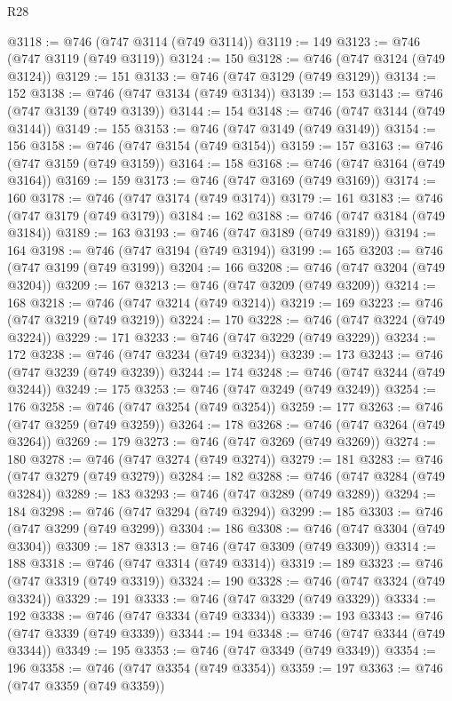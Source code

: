 \begin{lexlean}{R28}
\begin{coremodule}
@3118 := @746 (@747 @3114 (@749 @3114))
@3119 := 149
@3123 := @746 (@747 @3119 (@749 @3119))
@3124 := 150
@3128 := @746 (@747 @3124 (@749 @3124))
@3129 := 151
@3133 := @746 (@747 @3129 (@749 @3129))
@3134 := 152
@3138 := @746 (@747 @3134 (@749 @3134))
@3139 := 153
@3143 := @746 (@747 @3139 (@749 @3139))
@3144 := 154
@3148 := @746 (@747 @3144 (@749 @3144))
@3149 := 155
@3153 := @746 (@747 @3149 (@749 @3149))
@3154 := 156
@3158 := @746 (@747 @3154 (@749 @3154))
@3159 := 157
@3163 := @746 (@747 @3159 (@749 @3159))
@3164 := 158
@3168 := @746 (@747 @3164 (@749 @3164))
@3169 := 159
@3173 := @746 (@747 @3169 (@749 @3169))
@3174 := 160
@3178 := @746 (@747 @3174 (@749 @3174))
@3179 := 161
@3183 := @746 (@747 @3179 (@749 @3179))
@3184 := 162
@3188 := @746 (@747 @3184 (@749 @3184))
@3189 := 163
@3193 := @746 (@747 @3189 (@749 @3189))
@3194 := 164
@3198 := @746 (@747 @3194 (@749 @3194))
@3199 := 165
@3203 := @746 (@747 @3199 (@749 @3199))
@3204 := 166
@3208 := @746 (@747 @3204 (@749 @3204))
@3209 := 167
@3213 := @746 (@747 @3209 (@749 @3209))
@3214 := 168
@3218 := @746 (@747 @3214 (@749 @3214))
@3219 := 169
@3223 := @746 (@747 @3219 (@749 @3219))
@3224 := 170
@3228 := @746 (@747 @3224 (@749 @3224))
@3229 := 171
@3233 := @746 (@747 @3229 (@749 @3229))
@3234 := 172
@3238 := @746 (@747 @3234 (@749 @3234))
@3239 := 173
@3243 := @746 (@747 @3239 (@749 @3239))
@3244 := 174
@3248 := @746 (@747 @3244 (@749 @3244))
@3249 := 175
@3253 := @746 (@747 @3249 (@749 @3249))
@3254 := 176
@3258 := @746 (@747 @3254 (@749 @3254))
@3259 := 177
@3263 := @746 (@747 @3259 (@749 @3259))
@3264 := 178
@3268 := @746 (@747 @3264 (@749 @3264))
@3269 := 179
@3273 := @746 (@747 @3269 (@749 @3269))
@3274 := 180
@3278 := @746 (@747 @3274 (@749 @3274))
@3279 := 181
@3283 := @746 (@747 @3279 (@749 @3279))
@3284 := 182
@3288 := @746 (@747 @3284 (@749 @3284))
@3289 := 183
@3293 := @746 (@747 @3289 (@749 @3289))
@3294 := 184
@3298 := @746 (@747 @3294 (@749 @3294))
@3299 := 185
@3303 := @746 (@747 @3299 (@749 @3299))
@3304 := 186
@3308 := @746 (@747 @3304 (@749 @3304))
@3309 := 187
@3313 := @746 (@747 @3309 (@749 @3309))
@3314 := 188
@3318 := @746 (@747 @3314 (@749 @3314))
@3319 := 189
@3323 := @746 (@747 @3319 (@749 @3319))
@3324 := 190
@3328 := @746 (@747 @3324 (@749 @3324))
@3329 := 191
@3333 := @746 (@747 @3329 (@749 @3329))
@3334 := 192
@3338 := @746 (@747 @3334 (@749 @3334))
@3339 := 193
@3343 := @746 (@747 @3339 (@749 @3339))
@3344 := 194
@3348 := @746 (@747 @3344 (@749 @3344))
@3349 := 195
@3353 := @746 (@747 @3349 (@749 @3349))
@3354 := 196
@3358 := @746 (@747 @3354 (@749 @3354))
@3359 := 197
@3363 := @746 (@747 @3359 (@749 @3359))

\end{coremodule}
\end{lexlean}
